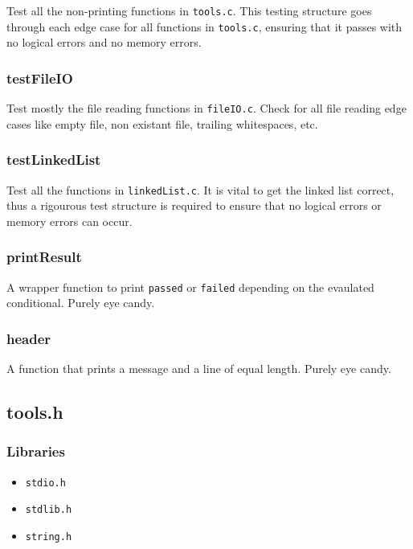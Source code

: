 \documentclass[a4paper, 12pt, titlepage]{article}
\newcommand{\code}[1]{\small\texttt{#1}\normalsize}
\begin{document}
Test all the non-printing functions in \code{tools.c}. This testing structure 
goes through each edge case for all functions in \code{tools.c}, ensuring 
that it passes with no logical errors and no memory errors.

\subsubsection{testFileIO}

Test mostly the file reading functions in \code{fileIO.c}. Check for all 
file reading edge cases like empty file, non existant file, trailing 
whitespaces, etc.

\subsubsection{testLinkedList}

Test all the functions in \code{linkedList.c}. It is vital to get the linked 
list correct, thus a rigourous test structure is required to ensure that no 
logical errors or memory errors can occur.

\subsubsection{printResult}

A wrapper function to print \code{passed} or \code{failed} depending on the 
evaulated conditional. Purely eye candy.

\subsubsection{header}

A function that prints a message and a line of equal length. Purely eye candy.

\pagebreak
\subsection{tools.h}
\subsubsection{Libraries}

\begin{itemize}[label={--}, noitemsep]
    \item \code{stdio.h}
    \item \code{stdlib.h}
    \item \code{string.h}
\end{itemize}
\end{document}
